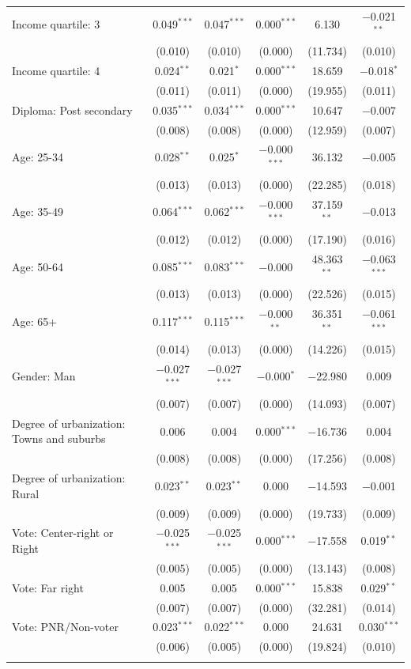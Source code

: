 \documentclass[12pt,english]{article}
\begin{document}
\begin{table}[h]
{{\begin{tabular}{@{\extracolsep{5pt}}lccccc}
  Income quartile: 3 & 0.049$^{***}$ & 0.047$^{***}$ & 0.000$^{***}$ & 6.130 & $-$0.021$^{**}$ \\ 
  & (0.010) & (0.010) & (0.000) & (11.734) & (0.010) \\ 
  Income quartile: 4 & 0.024$^{**}$ & 0.021$^{*}$ & 0.000$^{***}$ & 18.659 & $-$0.018$^{*}$ \\ 
  & (0.011) & (0.011) & (0.000) & (19.955) & (0.011) \\ 
  Diploma: Post secondary & 0.035$^{***}$ & 0.034$^{***}$ & 0.000$^{***}$ & 10.647 & $-$0.007 \\ 
  & (0.008) & (0.008) & (0.000) & (12.959) & (0.007) \\ 
  Age: 25\mbox{-}34 & 0.028$^{**}$ & 0.025$^{*}$ & $-$0.000$^{***}$ & 36.132 & $-$0.005 \\ 
  & (0.013) & (0.013) & (0.000) & (22.285) & (0.018) \\ 
  Age: 35\mbox{-}49 & 0.064$^{***}$ & 0.062$^{***}$ & $-$0.000$^{***}$ & 37.159$^{**}$ & $-$0.013 \\ 
  & (0.012) & (0.012) & (0.000) & (17.190) & (0.016) \\ 
  Age: 50\mbox{-}64 & 0.085$^{***}$ & 0.083$^{***}$ & $-$0.000 & 48.363$^{**}$ & $-$0.063$^{***}$ \\ 
  & (0.013) & (0.013) & (0.000) & (22.526) & (0.015) \\ 
  Age: 65+ & 0.117$^{***}$ & 0.115$^{***}$ & $-$0.000$^{**}$ & 36.351$^{**}$ & $-$0.061$^{***}$ \\ 
  & (0.014) & (0.013) & (0.000) & (14.226) & (0.015) \\ 
  Gender: Man & $-$0.027$^{***}$ & $-$0.027$^{***}$ & $-$0.000$^{*}$ & $-$22.980 & 0.009 \\ 
  & (0.007) & (0.007) & (0.000) & (14.093) & (0.007) \\ 
  Degree of urbanization: Towns and suburbs & 0.006 & 0.004 & 0.000$^{***}$ & $-$16.736 & 0.004 \\ 
  & (0.008) & (0.008) & (0.000) & (17.256) & (0.008) \\ 
  Degree of urbanization: Rural & 0.023$^{**}$ & 0.023$^{**}$ & 0.000 & $-$14.593 & $-$0.001 \\ 
  & (0.009) & (0.009) & (0.000) & (19.733) & (0.009) \\ 
  Vote: Center\mbox{-}right or Right & $-$0.025$^{***}$ & $-$0.025$^{***}$ & 0.000$^{***}$ & $-$17.558 & 0.019$^{**}$ \\ 
  & (0.005) & (0.005) & (0.000) & (13.143) & (0.008) \\ 
  Vote: Far right & 0.005 & 0.005 & 0.000$^{***}$ & 15.838 & 0.029$^{**}$ \\ 
  & (0.007) & (0.007) & (0.000) & (32.281) & (0.014) \\ 
  Vote: PNR\slash Non\mbox{-}voter & 0.023$^{***}$ & 0.022$^{***}$ & 0.000 & 24.631 & 0.030$^{***}$ \\ 
  & (0.006) & (0.005) & (0.000) & (19.824) & (0.010) \\ 
 \hline \\[-1.8ex] 


\end{tabular}}}
\end{table}
\end{document}
